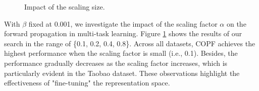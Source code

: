 \begin{figure}[t]
	\setlength{\belowcaptionskip}{0cm}
	\setlength{\abovecaptionskip}{0cm}
	\caption{Impact of the scaling size.}
        \vspace{-3mm}
	\label{fig:scaling}
\end{figure}

With $\beta$ fixed at 0.001, we investigate the impact of the scaling factor $\alpha$ on the forward propagation in multi-task learning. Figure \ref{fig:scaling} shows the results of our search in the range of \{0.1, 0.2, 0.4, 0.8\}. Across all datasets, COPF achieves the highest performance when the scaling factor is small (i.e., 0.1). Besides, the performance gradually decreases as the scaling factor increases, which is particularly evident in the Taobao dataset. These observations highlight the effectiveness of "fine-tuning" the representation space.

